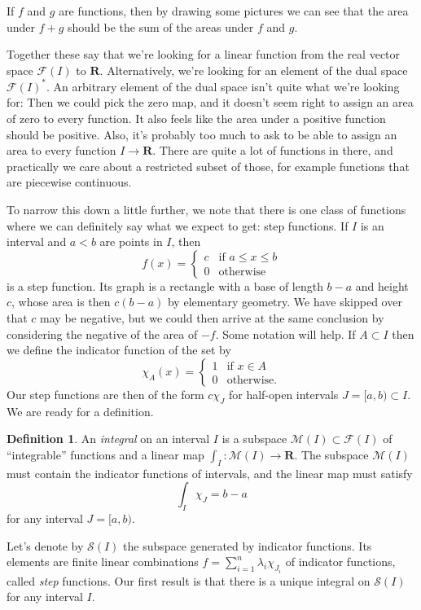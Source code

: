 \documentclass[11pt]{amsart}
\theoremstyle{definition}
\newtheorem{defi}[theo]{Definition}
\newcommand{\cc}[1]{\mathcal{#1}}
\def\RR{\mathbf{R}}
\begin{document}
If $f$ and $g$ are functions, then by drawing some pictures we can see that the area under $f+g$ should be the sum of the areas under $f$ and $g$.

Together these say that we're looking for a linear function from the real vector space $\cc F(I)$ to $\RR$.
Alternatively, we're looking for an element of the dual space $\cc F(I)^*$.
An arbitrary element of the dual space isn't quite what we're looking for:
Then we could pick the zero map, and it doesn't seem right to assign an area of zero to every function.
It also feels like the area under a positive function should be positive.
Also, it's probably too much to ask to be able to assign an area to every function $I \to \RR$.
There are quite a lot of functions in there, and practically we care about a restricted subset of those, for example functions that are piecewise continuous.

To narrow this down a little further, we note that there is one class of functions where we can definitely say what we expect to get: step functions.
If $I$ is an interval and $a < b$ are points in $I$, then
\[
f(x) = \begin{cases}
c & \text{if $a \leq x \leq b$}
\\
0 & \text{otherwise}
\end{cases}
\]
is a step function.
Its graph is a rectangle with a base of length $b - a$ and height $c$, whose area is then $c(b - a)$ by elementary geometry.
We have skipped over that $c$ may be negative, but we could then arrive at the same conclusion by considering the negative of the area of $-f$.
Some notation will help.
If $A \subset I$ then we define the indicator function of the set by
\[
\chi_A(x) = \begin{cases}
1 & \text{if $x \in A$}
\\
0 & \text{otherwise.}
\end{cases}
\]
Our step functions are then of the form $c \chi_J$ for half-open intervals $J = [a,b) \subset I$.
We are ready for a definition.


\begin{defi}
An \emph{integral} on an interval $I$ is a subspace $\cc M(I) \subset \cc F(I)$ of ``integrable'' functions and a linear map $\int_I : \cc M(I) \to \RR$.
The subspace $\cc M(I)$ must contain the indicator functions of intervals, and the linear map must satisfy
\[
\int_I \chi_{J} = b - a
\]
for any interval $J = [a,b)$.
\end{defi}

Let's denote by $\cc S(I)$ the subspace generated by indicator functions.
Its elements are finite linear combinations $f = \sum_{i=1}^n \lambda_i \chi_{J_i}$ of indicator functions, called \emph{step} functions.
Our first result is that there is a unique integral on $\cc S(I)$ for any interval $I$.
\end{document}
